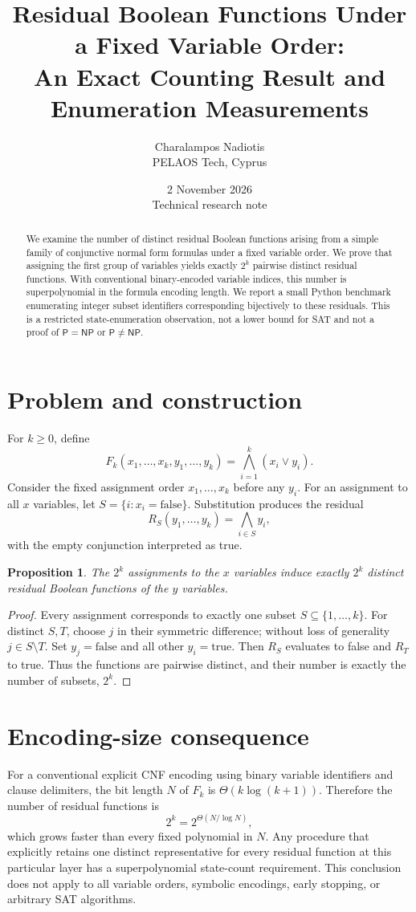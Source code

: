 \documentclass[11pt,a4paper]{article}
\title{Residual Boolean Functions Under a Fixed Variable Order:\\An Exact Counting Result and Enumeration Measurements}
\author{Charalampos Nadiotis\\PELAOS Tech, Cyprus}
\date{2 November 2026\\Technical research note}
\newtheorem{proposition}{Proposition}
\begin{document}
\maketitle
\begin{abstract}
We examine the number of distinct residual Boolean functions arising from a simple family of conjunctive normal form formulas under a fixed variable order. We prove that assigning the first group of variables yields exactly $2^k$ pairwise distinct residual functions. With conventional binary-encoded variable indices, this number is superpolynomial in the formula encoding length. We report a small Python benchmark enumerating integer subset identifiers corresponding bijectively to these residuals. This is a restricted state-enumeration observation, not a lower bound for SAT and not a proof of $\mathsf{P}=\mathsf{NP}$ or $\mathsf{P}\ne\mathsf{NP}$.
\end{abstract}
\section{Problem and construction}
For $k\geq 0$, define
\[
 F_k(x_1,\ldots,x_k,y_1,\ldots,y_k)
 =\bigwedge_{i=1}^{k}(x_i\lor y_i).
\]
Consider the fixed assignment order $x_1,\ldots,x_k$ before any $y_i$. For an assignment to all $x$ variables, let $S=\{i:x_i=\mathrm{false}\}$. Substitution produces the residual
\[
 R_S(y_1,\ldots,y_k)=\bigwedge_{i\in S}y_i,
\]
with the empty conjunction interpreted as true.
\begin{proposition}
The $2^k$ assignments to the $x$ variables induce exactly $2^k$ distinct residual Boolean functions of the $y$ variables.
\end{proposition}
\begin{proof}
Every assignment corresponds to exactly one subset $S\subseteq\{1,\ldots,k\}$. For distinct $S,T$, choose $j$ in their symmetric difference; without loss of generality $j\in S\setminus T$. Set $y_j=\mathrm{false}$ and all other $y_i=\mathrm{true}$. Then $R_S$ evaluates to false and $R_T$ to true. Thus the functions are pairwise distinct, and their number is exactly the number of subsets, $2^k$.
\end{proof}
\section{Encoding-size consequence}
For a conventional explicit CNF encoding using binary variable identifiers and clause delimiters, the bit length $N$ of $F_k$ is $\Theta(k\log(k+1))$. Therefore the number of residual functions is
\[
 2^k=2^{\Theta(N/\log N)},
\]
which grows faster than every fixed polynomial in $N$. Any procedure that explicitly retains one distinct representative for every residual function at this particular layer has a superpolynomial state-count requirement. This conclusion does not apply to all variable orders, symbolic encodings, early stopping, or arbitrary SAT algorithms.
\end{document}
